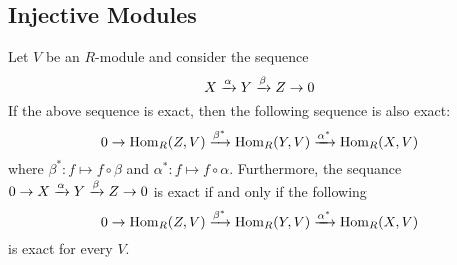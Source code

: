 \subsection{Injective Modules}

\begin{thm}
    Let $V$ be an $R$-module and consider the sequence
    \[X \xrightarrow{\alpha} Y\xrightarrow{\beta} Z \to 0\]
    If the above sequence is exact, then the following sequence is also exact:
    \[0 \to \operatorname{Hom}_R(Z,V) \xrightarrow{\beta^*} \operatorname{Hom}_R(Y,V) \xrightarrow{\alpha^*} \operatorname{Hom}_R(X,V)\]
    where $\beta^*: f\mapsto f\circ \beta$ and $\alpha^*: f\mapsto f\circ \alpha$. Furthermore, the sequance $0 \to X \xrightarrow{\alpha} Y\xrightarrow{\beta} Z \to 0$ is exact if and only if the following
    \[0 \to \operatorname{Hom}_R(Z,V) \xrightarrow{\beta^*} \operatorname{Hom}_R(Y,V) \xrightarrow{\alpha^*} \operatorname{Hom}_R(X,V)\]
    is exact for every $V$.
\end{thm}
